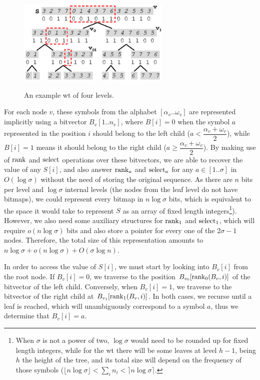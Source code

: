 \documentclass[a4paper,10pt,twoside]{book}
\begin{document}
    \begin{figure}[ht]
		\begin{center}
			{\includegraphics[width=0.65\textwidth]{figures/wt1.eps}}
		\end{center}
		\caption{An example \acrlong{wt} of four levels.}
		\label{fig:wt}
	\end{figure}
    
    For each node $v$, these symbols from the alphabet $[\alpha_v..\omega_v]$ are represented implicitly using a bitvector $B_v[1..n_v]$, where $B[i] = 0$ when the symbol $a$ represented in the position $i$ should belong to the left child ($a < \dfrac{\alpha_v + \omega_v}{2}$), while $B[i] = 1$ means it should belong to the right child ($a \geq \dfrac{\alpha_v + \omega_v}{2}$). By making use of $\operatorname{rank}$ and $\operatorname{select}$ operations over these bitvectors, we are able to recover the value of any $S[i]$, and also answer $\operatorname{rank}_a$ and $\operatorname{select}_a$ for any $a \in [1..\sigma]$ in $O(\log\sigma)$ without the need of storing the original sequence. As there are $n$ bits per level and $\log\sigma$ internal levels (the nodes from the leaf level do not have bitmaps), we could represent every bitmap in $n\log\sigma$ bits, which is equivalent to the space it would take to represent $S$ as an array of fixed length integers\footnote{When $\sigma$ is not a power of two, $\log\sigma$ would need to be rounded up for fixed length integers, while for the \gls{wt} there will be some leaves at level $h-1$, being $h$ the height of the tree, and its total size will depend on the frequency of those symbols ($\lfloor n\log\sigma\rfloor < \sum_i n_i < \rceil n\log\sigma\rceil$.}). However, we also need some auxiliary structures for $\operatorname{rank}_1$ and $\operatorname{select}_1$, which will require $o(n\log\sigma)$ bits and also store a pointer for every one of the $2\sigma-1$ nodes. Therefore, the total size of this representation amounts to $n\log\sigma + o(n\log\sigma) + O(\sigma\log n)$.
    
    In order to access the value of $S[i]$, we must start by looking into $B_v[i]$ from the root node. If $B_v[i]=0$, we traverse to the position $B_{v_0}[\operatorname{rank}_0(B_v,i)]$ of the bitvector of the left child. Conversely, when $B_v[i]=1$, we traverse to the bitvector of the right child at $B_{v_1}[\operatorname{rank}_1(B_v,i)]$. In both cases, we recurse until a leaf is reached, which will unambiguously correspond to a symbol $a$, thus we determine that $B_v[i]=a$.
    
\end{document}
